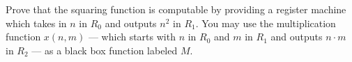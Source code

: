 \begin{problem}
  Prove that the squaring function is computable by providing
  a register machine which takes in $n$ in $R_0$ and outputs
  $n^2$ in $R_1$.
  You may use the multiplication function $x(n, m)$ ---
  which starts with $n$ in $R_0$ and $m$ in $R_1$ and outputs
  $n \cdot m$ in $R_2$ --- as a black box function labeled $M$.

  \begin{answer}
    
  \end{answer}
\end{problem}
